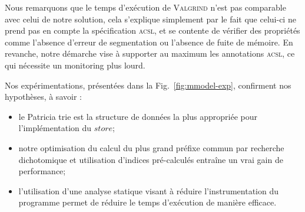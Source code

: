 \documentclass[french]{spimufcphdthesis}
\begin{document}
Nous remarquons que le temps d'exécution de \textsc{Valgrind} n'est pas
comparable avec celui de notre solution, cela s'explique simplement par le fait
que celui-ci ne prend pas en compte la spécification \textsc{acsl}, et se
contente de vérifier des propriétés comme l'absence d'erreur de segmentation ou
l'absence de fuite de mémoire. En revanche, notre démarche vise à supporter au
maximum les annotations \textsc{acsl}, ce qui nécessite un monitoring plus
lourd.

Nos expérimentations, présentées dans la Fig.~\ref{fig:mmodel-exp}, confirment
nos hypothèses, à savoir :
\begin{itemize}
\item le Patricia trie est la structure de données la plus appropriée pour
  l'implémentation du $store$;
\item notre optimisation du calcul du plus grand préfixe commun par recherche
  dichotomique et utilisation d'indices pré-calculés entraîne un vrai gain de
  performance;
\item l'utilisation d'une analyse statique visant à réduire l'instrumentation
  du programme permet de réduire le temps d'exécution de manière efficace.
\end{itemize}
\end{document}
